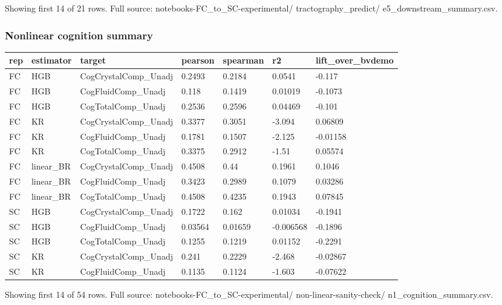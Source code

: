 Showing first 14 of 21 rows. Full source: notebooks-FC\_to\_SC-experimental/ tractography\_predict/ e5\_downstream\_summary.csv.

\subsubsection{Nonlinear cognition summary}\label{nonlinear-cognition-summary}

{\def\LTcaptype{none} %
\begin{longtable}[]{@{}lllllll@{}}
\toprule\noalign{}
rep & estimator & target & pearson & spearman & r2 & lift\_over\_bvdemo \\
\midrule\noalign{}
\endhead
\bottomrule\noalign{}
\endlastfoot
FC & HGB & CogCrystalComp\_Unadj & 0.2493 & 0.2184 & 0.0541 & -0.117 \\
FC & HGB & CogFluidComp\_Unadj & 0.118 & 0.1419 & 0.01019 & -0.1073 \\
FC & HGB & CogTotalComp\_Unadj & 0.2536 & 0.2596 & 0.04469 & -0.101 \\
FC & KR & CogCrystalComp\_Unadj & 0.3377 & 0.3051 & -3.094 & 0.06809 \\
FC & KR & CogFluidComp\_Unadj & 0.1781 & 0.1507 & -2.125 & -0.01158 \\
FC & KR & CogTotalComp\_Unadj & 0.3375 & 0.2912 & -1.51 & 0.05574 \\
FC & linear\_BR & CogCrystalComp\_Unadj & 0.4508 & 0.44 & 0.1961 & 0.1046 \\
FC & linear\_BR & CogFluidComp\_Unadj & 0.3423 & 0.2989 & 0.1079 & 0.03286 \\
FC & linear\_BR & CogTotalComp\_Unadj & 0.4508 & 0.4235 & 0.1943 & 0.07845 \\
SC & HGB & CogCrystalComp\_Unadj & 0.1722 & 0.162 & 0.01034 & -0.1941 \\
SC & HGB & CogFluidComp\_Unadj & 0.03564 & 0.01659 & -0.006568 & -0.1896 \\
SC & HGB & CogTotalComp\_Unadj & 0.1255 & 0.1219 & 0.01152 & -0.2291 \\
SC & KR & CogCrystalComp\_Unadj & 0.241 & 0.2229 & -2.468 & -0.02867 \\
SC & KR & CogFluidComp\_Unadj & 0.1135 & 0.1124 & -1.603 & -0.07622 \\
\end{longtable}
}

Showing first 14 of 54 rows. Full source: notebooks-FC\_to\_SC-experimental/ non-linear-sanity-check/ n1\_cognition\_summary.csv.

